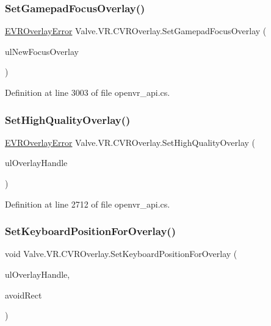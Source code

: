 \subsubsection{\texorpdfstring{SetGamepadFocusOverlay()}{SetGamepadFocusOverlay()}}
{\footnotesize\ttfamily \mbox{\hyperlink{namespace_valve_1_1_v_r_aaee5c5144f42b7969d45b854f51b0c18}{E\+V\+R\+Overlay\+Error}} Valve.\+V\+R.\+C\+V\+R\+Overlay.\+Set\+Gamepad\+Focus\+Overlay (\begin{DoxyParamCaption}\item[{ulong}]{ul\+New\+Focus\+Overlay }\end{DoxyParamCaption})}



Definition at line 3003 of file openvr\+\_\+api.\+cs.

\mbox{\label{class_valve_1_1_v_r_1_1_c_v_r_overlay_a0f3ea42dac819a5fa592161da610c194}} 
\subsubsection{\texorpdfstring{SetHighQualityOverlay()}{SetHighQualityOverlay()}}
{\footnotesize\ttfamily \mbox{\hyperlink{namespace_valve_1_1_v_r_aaee5c5144f42b7969d45b854f51b0c18}{E\+V\+R\+Overlay\+Error}} Valve.\+V\+R.\+C\+V\+R\+Overlay.\+Set\+High\+Quality\+Overlay (\begin{DoxyParamCaption}\item[{ulong}]{ul\+Overlay\+Handle }\end{DoxyParamCaption})}



Definition at line 2712 of file openvr\+\_\+api.\+cs.

\mbox{\label{class_valve_1_1_v_r_1_1_c_v_r_overlay_afaf593636880c06d2965a59ae839e3d8}} 
\subsubsection{\texorpdfstring{SetKeyboardPositionForOverlay()}{SetKeyboardPositionForOverlay()}}
{\footnotesize\ttfamily void Valve.\+V\+R.\+C\+V\+R\+Overlay.\+Set\+Keyboard\+Position\+For\+Overlay (\begin{DoxyParamCaption}\item[{ulong}]{ul\+Overlay\+Handle,  }\item[{\mbox{\hyperlink{struct_valve_1_1_v_r_1_1_hmd_rect2__t}{Hmd\+Rect2\+\_\+t}}}]{avoid\+Rect }\end{DoxyParamCaption})}



